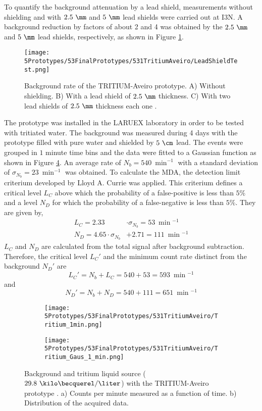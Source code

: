 To quantify the background attenuation by a lead shield, measurements without shielding and with $2.5~\mm$ and $5~\mm$ lead shields were carried out at I3N. A background reduction by factors of about 2 and 4 was obtained by the $2.5~\mm$ and $5~\mm$ lead shields, respectively, as shown in Figure \ref{fig:LeadShieldTest}.
\begin{figure}[h]
\centering
\texttt{[image: 5Prototypes/53FinalPrototypes/531TritiumAveiro/LeadShieldTest.png]}
\caption{Background rate of the TRITIUM-Aveiro prototype. A) Without shielding. B) With a lead shield of $2.5~\mm$ thickness. C) With two lead shields of $2.5~\mm$ thickness each one \cite{ExperimentalPaperCarlos}.\label{fig:LeadShieldTest}}
\end{figure}

The prototype was installed in the LARUEX laboratory in order to be tested with tritiated water. The background was measured during 4 days with the prototype filled with pure water and shielded by $5~\cm$ lead. The events were grouped in $1$ minute time bins and the data were fitted to a Gaussian function as shown in Figure \ref{fig:BackgroundTritium1min}. An average rate of $N_b = 540~\min^{-1}$ with a standard deviation of $\sigma_{N_b}=23~\min^{-1}$ was obtained. To calculate the MDA, the detection limit criterium developed by Lloyd A. Currie \cite{Knoll} was applied. This criterium defines a critical level $L_C$ above which the probability of a false-positive is less than $5\%$ and a level $N_D$ for which the probability of a false-negative is less than $5\%$. They are given by,
\begin{equation}
  \begin{aligned}
L_C = 2.33&\cdot{}\sigma_{N_b}=53 ~\min{}^{-1}\\
N_D = 4.65 \cdot{}\sigma_{N_b}& + 2.71 = 111~\min{}^{-1}
 \end{aligned}\label{eq:EquationNetCounts}
\end{equation}
$L_C$ and $N_D$ are calculated from the total signal after background subtraction. Therefore, the critical level $L_C'$ and the minimum count rate distinct from the background $N_D'$ are $$L_C'= N_b + L_C = 540 + 53 = 593~\min{}^{-1}$$ and $$N_D'= N_b + N_D = 540 + 111=651~\min{}^{-1}$$
\begin{figure}
\centering
    \begin{subfigure}[b]{0.55\textwidth}
    \centering
    \texttt{[image: 5Prototypes/53FinalPrototypes/531TritiumAveiro/Tritium\_1min.png]}  
    \caption{\label{subfig:MeasurementInRealTime}}
    \end{subfigure}
    \hfill
    \begin{subfigure}[b]{0.55\textwidth}
    \centering
    \texttt{[image: 5Prototypes/53FinalPrototypes/531TritiumAveiro/Tritium\_Gaus\_1\_min.png]}  
    \caption{\label{subfig:DistributionofMeasurement}}
    \end{subfigure}
 \caption{Background and tritium liquid source ($29.8~\kilo\becquerel/\liter$) with the TRITIUM-Aveiro prototype \cite{ExperimentalPaperCarlos}. a) Counts per minute measured as a function of time. b) Distribution of the acquired data.}
 \label{fig:BackgroundTritium1min}
\end{figure}
